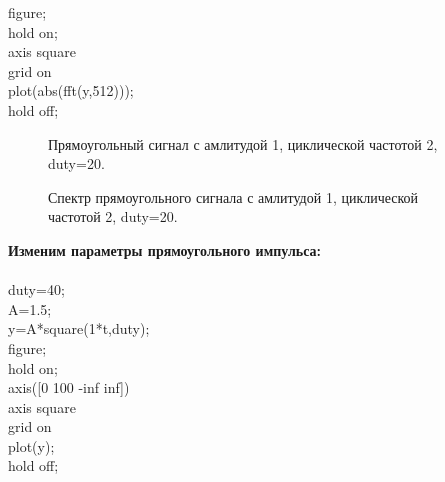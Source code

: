 \documentclass[12pt,a4paper]{scrartcl}
\begin{document}
figure;\\
hold on;\\
axis square\\
grid on\\
plot(abs(fft(y,512)));\\
hold off;\\

\begin{figure}[h!]
\caption{Прямоугольный сигнал с амлитудой 1, циклической частотой 2, duty=20.}
\end{figure}
\newpage

\begin{figure}[h!]
\caption{Спектр прямоугольного сигнала с амлитудой 1, циклической частотой 2, duty=20.}
\end{figure}

\textbf{Изменим параметры прямоугольного импульса:\\\\}
duty=40;\\
A=1.5;\\

y=A*square(1*t,duty);\\

figure;\\
hold on;\\
axis([0 100 -inf inf])\\
axis square\\
grid on\\
plot(y);\\
hold off;\\
\end{document}

